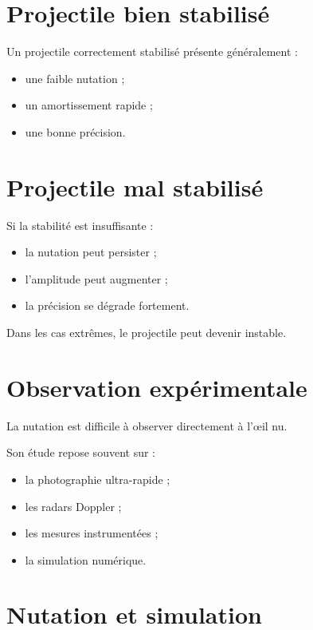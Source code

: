 \section{Projectile bien stabilisé}

Un projectile correctement stabilisé présente généralement :

\begin{itemize}
    \item une faible nutation ;
    \item un amortissement rapide ;
    \item une bonne précision.
\end{itemize}

\section{Projectile mal stabilisé}

Si la stabilité est insuffisante :

\begin{itemize}
    \item la nutation peut persister ;
    \item l'amplitude peut augmenter ;
    \item la précision se dégrade fortement.
\end{itemize}

Dans les cas extrêmes, le projectile peut devenir instable.

\section{Observation expérimentale}

La nutation est difficile à observer directement à l'œil nu.

Son étude repose souvent sur :

\begin{itemize}
    \item la photographie ultra-rapide ;
    \item les radars Doppler ;
    \item les mesures instrumentées ;
    \item la simulation numérique.
\end{itemize}

\section{Nutation et simulation}

